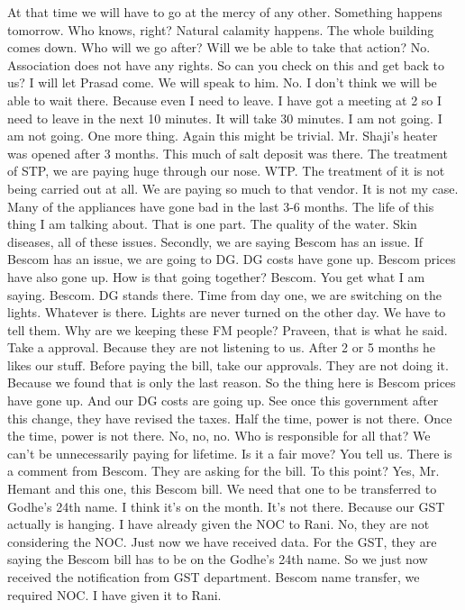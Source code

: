 At that time we will have to go at the mercy of any other.
Something happens tomorrow.
Who knows, right?
Natural calamity happens.
The whole building comes down.
Who will we go after?
Will we be able to take that action?
No.
Association does not have any rights.
So can you check on this and get back to us?
I will let Prasad come.
We will speak to him.
No.
I don't think we will be able to wait there.
Because even I need to leave.
I have got a meeting at 2 so I need to leave in the next 10 minutes.
It will take 30 minutes.
I am not going.
I am not going.
One more thing.
Again this might be trivial.
Mr. Shaji's heater was opened after 3 months.
This much of salt deposit was there.
The treatment of STP, we are paying huge through our nose.
WTP.
The treatment of it is not being carried out at all.
We are paying so much to that vendor.
It is not my case.
Many of the appliances have gone bad in the last 3-6 months.
The life of this thing I am talking about.
That is one part.
The quality of the water.
Skin diseases, all of these issues.
Secondly, we are saying Bescom has an issue.
If Bescom has an issue, we are going to DG.
DG costs have gone up.
Bescom prices have also gone up.
How is that going together?
Bescom.
You get what I am saying.
Bescom.
DG stands there.
Time from day one, we are switching on the lights.
Whatever is there.
Lights are never turned on the other day.
We have to tell them.
Why are we keeping these FM people?
Praveen, that is what he said.
Take a approval.
Because they are not listening to us.
After 2 or 5 months he likes our stuff.
Before paying the bill, take our approvals.
They are not doing it.
Because we found that is only the last reason.
So the thing here is Bescom prices have gone up.
And our DG costs are going up.
See once this government after this change,
they have revised the taxes.
Half the time, power is not there.
Once the time, power is not there.
No, no, no.
Who is responsible for all that?
We can't be unnecessarily paying for lifetime.
Is it a fair move?
You tell us.
There is a comment from Bescom.
They are asking for the bill.
To this point?
Yes, Mr. Hemant and this one, this Bescom bill.
We need that one to be transferred to Godhe's 24th name.
I think it's on the month.
It's not there.
Because our GST actually is hanging.
I have already given the NOC to Rani.
No, they are not considering the NOC.
Just now we have received data.
For the GST, they are saying the Bescom bill has to be on the Godhe's 24th name.
So we just now received the notification from GST department.
Bescom name transfer, we required NOC.
I have given it to Rani.
